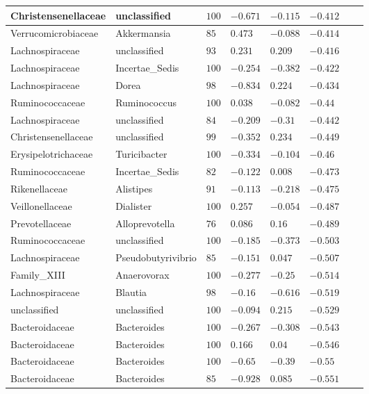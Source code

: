 \begin{table}[!ht]
\begin{tiny}
\begin{tabular}{|l|l|l|l|l|l|l|l|}
Christensenellaceae & unclassified & $100$ & $-0.671$ & $-0.115$ & $-0.412$ \\ \hline
Verrucomicrobiaceae & Akkermansia & $85$ & $0.473$ & $-0.088$ & $-0.414$ \\ \hline
Lachnospiraceae & unclassified & $93$ & $0.231$ & $0.209$ & $-0.416$ \\ \hline
Lachnospiraceae & Incertae_Sedis & $100$ & $-0.254$ & $-0.382$ & $-0.422$ \\ \hline
Lachnospiraceae & Dorea & $98$ & $-0.834$ & $0.224$ & $-0.434$ \\ \hline
Ruminococcaceae & Ruminococcus & $100$ & $0.038$ & $-0.082$ & $-0.44$ \\ \hline
Lachnospiraceae & unclassified & $84$ & $-0.209$ & $-0.31$ & $-0.442$ \\ \hline
Christensenellaceae & unclassified & $99$ & $-0.352$ & $0.234$ & $-0.449$ \\ \hline
Erysipelotrichaceae & Turicibacter & $100$ & $-0.334$ & $-0.104$ & $-0.46$ \\ \hline
Ruminococcaceae & Incertae_Sedis & $82$ & $-0.122$ & $0.008$ & $-0.473$ \\ \hline
Rikenellaceae & Alistipes & $91$ & $-0.113$ & $-0.218$ & $-0.475$ \\ \hline
Veillonellaceae & Dialister & $100$ & $0.257$ & $-0.054$ & $-0.487$ \\ \hline
Prevotellaceae & Alloprevotella & $76$ & $0.086$ & $0.16$ & $-0.489$ \\ \hline
Ruminococcaceae & unclassified & $100$ & $-0.185$ & $-0.373$ & $-0.503$ \\ \hline
Lachnospiraceae & Pseudobutyrivibrio & $85$ & $-0.151$ & $0.047$ & $-0.507$ \\ \hline
Family_XIII & Anaerovorax & $100$ & $-0.277$ & $-0.25$ & $-0.514$ \\ \hline
Lachnospiraceae & Blautia & $98$ & $-0.16$ & $-0.616$ & $-0.519$ \\ \hline
unclassified & unclassified & $100$ & $-0.094$ & $0.215$ & $-0.529$ \\ \hline
Bacteroidaceae & Bacteroides & $100$ & $-0.267$ & $-0.308$ & $-0.543$ \\ \hline
Bacteroidaceae & Bacteroides & $100$ & $0.166$ & $0.04$ & $-0.546$ \\ \hline
Bacteroidaceae & Bacteroides & $100$ & $-0.65$ & $-0.39$ & $-0.55$ \\ \hline
Bacteroidaceae & Bacteroides & $85$ & $-0.928$ & $0.085$ & $-0.551$ \\ \hline

\end{tabular}
\end{tiny}
\end{table}
